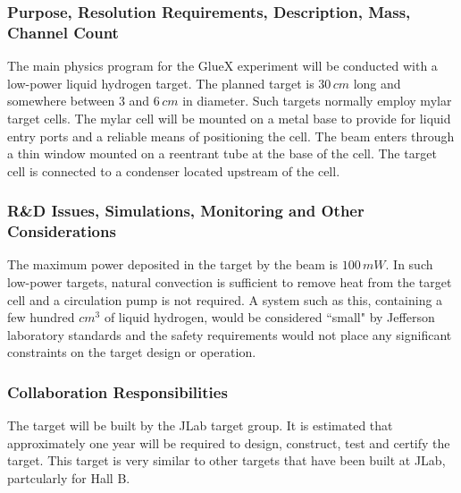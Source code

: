 \subsubsection*{Purpose, Resolution Requirements, Description, Mass, Channel Count}
The main physics program for the GlueX experiment will be conducted with a
low-power liquid hydrogen target. The planned target is $30\, cm$ long and
somewhere between $3$ and $6\, cm$ in diameter. Such targets normally 
employ mylar target cells. The mylar cell will be mounted on a metal base 
to provide for liquid entry ports and a reliable means of positioning the 
cell. The beam enters through a thin window mounted on a reentrant tube at 
the base of the cell. The target cell is connected to a condenser located 
upstream of the cell.

\subsubsection*{R\&D Issues, Simulations, Monitoring and Other Considerations}
The maximum power deposited in the target by the beam is $100\, mW$.  In such low-power
targets, natural convection is sufficient to remove heat from the target cell and a
circulation pump is not required. A system such as this, containing a few hundred 
$cm^3$ of liquid hydrogen, would be considered ``small" by Jefferson laboratory standards
and the safety requirements would not place any significant constraints on the target
design or operation.

\subsubsection*{Collaboration Responsibilities}
The target will be built by the JLab target group. It is estimated that
approximately one year will be required to design, construct, test and
certify the target. This target is very similar to other targets that
have been built at JLab, partcularly for Hall B.

